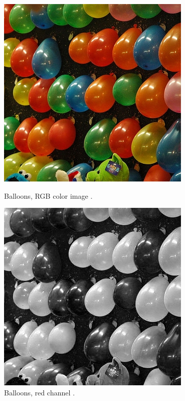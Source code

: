 \begin{figure}[ht]
    \begin{minipage}[t]{0.45\linewidth}
        \centering
        \includegraphics[width=\textwidth]{images/balloons/balloons-original.jpg}
        \caption{Balloons, RGB color image \cite{balloons}.}
        \label{fig:balloons-rgb}
    \end{minipage}
    \hspace{0.5cm}
    \begin{minipage}[t]{0.45\linewidth}
        \centering
        \includegraphics[width=\textwidth]{images/balloons/balloons-red-channel.jpg}
        \caption{Balloons, red channel \cite{balloons}.}
        \label{fig:balloons-red}
    \end{minipage}
\end{figure}
